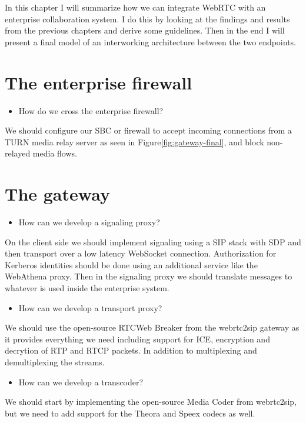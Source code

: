 In this chapter I will summarize how we can integrate WebRTC with an enterprise collaboration system. I do this by looking at the findings and results from the previous chapters and derive some guidelines. Then in the end I will present a final model of an interworking architecture between the two endpoints.

\section{The enterprise firewall}

\begin{itemize}
\item How do we cross the enterprise firewall?
\end{itemize}
We should configure our SBC or firewall to accept incoming connections from a TURN media relay server as seen in Figure\ref{fig:gateway-final}, and block non-relayed media flows.

\section{The gateway}

\begin{itemize}
\item How can we develop a signaling proxy?
\end{itemize}
On the client side we should implement signaling using a SIP stack with SDP and then transport over a low latency WebSocket connection. Authorization for Kerberos identities should be done using an additional service like the WebAthena proxy. Then in the signaling proxy we should translate messages to whatever is used inside the enterprise system.

\begin{itemize}
\item How can we develop a transport proxy?
\end{itemize}
We should use the open-source RTCWeb Breaker from the webrtc2sip gateway as it provides everything we need including support for ICE, encryption and decrytion of RTP and RTCP packets. In addition to multiplexing and demultiplexing the streams.

\begin{itemize}
\item How can we develop a transcoder?
\end{itemize}
We should start by implementing the open-source Media Coder from webrtc2sip, but we need to add support for the Theora and Speex codecs as well.

